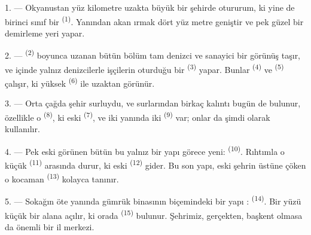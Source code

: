 
\VUsaut{2.0mm}
\VUsaut{3.0mm}
\VUfilet{16mm}
\VUsaut{5.6mm}
\VUsaut{1.4mm}
\VUsaut{2.2mm}

\VUsaut{3.0mm}

1. --- Okyanustan yüz kilometre uzakta büyük bir şehirde otururum, ki yine de
birinci sınıf bir  \textsuperscript{(1)}. Yanından akan ırmak
dört yüz metre geniştir ve pek güzel bir demirleme yeri yapar.

2. ---  \textsuperscript{(2)} boyunca uzanan bütün bölüm tam
denizci ve sanayici bir görünüş taşır, ve içinde yalnız denizcilerle işçilerin
oturduğu bir  \textsuperscript{(3)} yapar. Bunlar
 \textsuperscript{(4)} ve 
\textsuperscript{(5)} çalışır, ki yüksek  \textsuperscript{(6)}
ile  uzaktan görünür.

3. --- Orta çağda şehir surluydu, ve surlarından birkaç kalıntı bugün de
bulunur, özellikle o  \textsuperscript{(8)}, ki eski  \textsuperscript{(7)}, ve iki yanında iki 
\textsuperscript{(9)} var; onlar da şimdi  olarak
kullanılır.

4. --- Pek eski görünen bütün bu  yalnız bir yapı görece
yeni:  \textsuperscript{(10)}. Rıhtımla o küçük
 \textsuperscript{(11)} arasında durur, ki eski
 \textsuperscript{(12)} gider. Bu son yapı, eski
şehrin üstüne çöken o kocaman  \textsuperscript{(13)}
kolayca tanınır.

5. --- Sokağın öte yanında gümrük binasının biçemindeki bir yapı
:  \textsuperscript{(14)}. Bir yüzü
küçük bir alana açılır, ki orada  \textsuperscript{(15)}
bulunur. Şehrimiz, gerçekten, başkent olmasa da önemli bir il merkezi.


